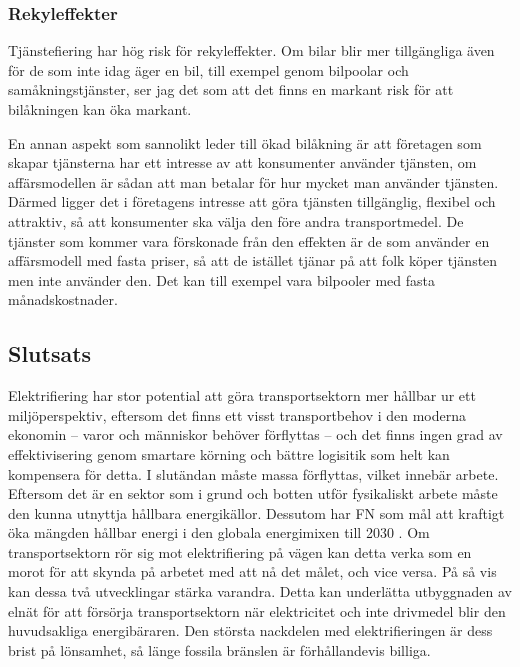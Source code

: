 \documentclass{article}
\begin{document}
\subsubsection{Rekyleffekter}

Tjänstefiering har hög risk för rekyleffekter. Om bilar blir mer tillgängliga även för de som inte idag äger en bil, till exempel genom bilpoolar och samåkningstjänster, ser jag det som att det finns en markant risk för att bilåkningen kan öka markant.

En annan aspekt som sannolikt leder till ökad bilåkning är att företagen som skapar tjänsterna har ett intresse av att konsumenter använder tjänsten, om affärsmodellen är sådan att man betalar för hur mycket man använder tjänsten. Därmed ligger det i företagens intresse att göra tjänsten tillgänglig, flexibel och attraktiv, så att konsumenter ska välja den före andra transportmedel. De tjänster som kommer vara förskonade från den effekten är de som använder en affärsmodell med fasta priser, så att de istället tjänar på att folk köper tjänsten men inte använder den. Det kan till exempel vara bilpooler med fasta månadskostnader.

\subsection{Slutsats}

Elektrifiering har stor potential att göra transportsektorn mer hållbar ur ett miljöperspektiv, eftersom det finns ett visst transportbehov i den moderna ekonomin – varor och människor behöver förflyttas – och det finns ingen grad av effektivisering genom smartare körning och bättre logisitik som helt kan kompensera för detta. I slutändan måste massa förflyttas, vilket innebär arbete. Eftersom det är en sektor som i grund och botten utför fysikaliskt arbete måste den kunna utnyttja hållbara energikällor. Dessutom har FN som mål att kraftigt öka mängden hållbar energi i den globala energimixen till 2030 . Om transportsektorn rör sig mot elektrifiering på vägen kan detta verka som en morot för att skynda på arbetet med att nå det målet, och vice versa. På så vis kan dessa två utvecklingar stärka varandra. Detta kan underlätta utbyggnaden av elnät för att försörja transportsektorn när elektricitet och inte drivmedel blir den huvudsakliga energibäraren. Den största nackdelen med elektrifieringen är dess brist på lönsamhet, så länge fossila bränslen är förhållandevis billiga.
\end{document}
